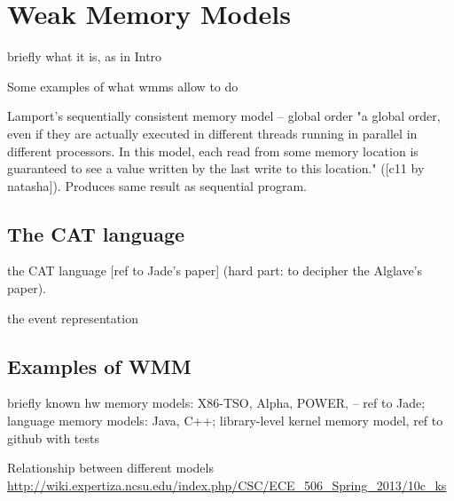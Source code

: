 \chapter{Weak Memory Models}
\label{section:wmm}

briefly what it is, as in Intro

Some examples of what wmms allow to do

Lamport's sequentially consistent memory model -- global order "a global order, even if they are actually executed in different threads running in parallel in different processors. In this model, each read from some memory location is guaranteed to see a value written by the last write to this location." ([c11 by natasha]). Produces same result as sequential program.


\section{The CAT language}

the CAT language [ref to Jade's paper] (hard part: to decipher the Alglave's paper).

the event representation

\section{Examples of WMM}

briefly known hw memory models: X86-TSO, Alpha, POWER, -- ref to Jade;
language memory models: Java, C++;
library-level kernel memory model, ref to github with tests

Relationship between different models \url{http://wiki.expertiza.ncsu.edu/index.php/CSC/ECE_506_Spring_2013/10c_ks}

